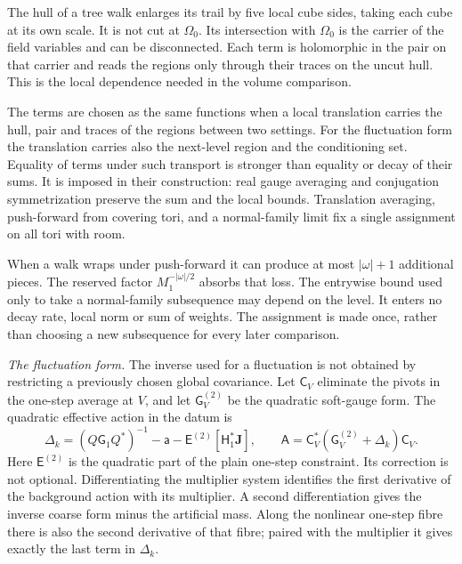 \documentclass[11pt,letterpaper,reqno]{amsart}
\theoremstyle{definition}
\theoremstyle{remark}
\begin{document}
The hull of a tree walk enlarges its trail by
five local cube sides, taking each cube at its
own scale. It is not cut at $\Omega_0$. Its
intersection with $\Omega_0$ is the carrier of
the field variables and can be disconnected.
Each term is holomorphic in the pair on that
carrier and reads the regions only through
their traces on the uncut hull. This is the
local dependence needed in the volume comparison.

The terms are chosen as the same functions when
a local translation carries the hull, pair and
traces of the regions between two settings.
For the fluctuation form the translation carries
also the next-level region and the conditioning
set. Equality of terms under such transport is
stronger than equality or decay of their sums.
It is imposed in their construction: real gauge
averaging and conjugation symmetrization preserve
the sum and the local bounds. Translation
averaging, push-forward from covering tori, and
a normal-family limit fix a single assignment
on all tori with room.

When a walk wraps under push-forward it can
produce at most $|\omega|+1$ additional pieces.
The reserved factor $M_1^{-|\omega|/2}$ absorbs
that loss. The entrywise bound used only to
take a normal-family subsequence may depend
on the level. It enters no decay rate, local
norm or sum of weights. The assignment is
made once, rather than choosing a new
subsequence for every later comparison.

\emph{The fluctuation form.}
The inverse used for a fluctuation is not
obtained by restricting a previously chosen
global covariance. Let $\mathsf C_V$ eliminate
the pivots in the one-step average at $V$,
and let $\mathsf G_V^{(2)}$ be the quadratic
soft-gauge form. The quadratic effective
action in the datum is
\[
 \Delta_k=(Q\mathsf G_1Q^*)^{-1}-\mathsf a
              -\mathsf E^{(2)}[\mathsf H_1^*\mathbf J],
 \qquad
 \mathsf A=\mathsf C_V^*(\mathsf G_V^{(2)}+\Delta_k)\mathsf C_V.
\]
Here $\mathsf E^{(2)}$ is the quadratic part of
the plain one-step constraint. Its correction
is not optional. Differentiating the multiplier
system identifies the first derivative of the
background action with its multiplier. A
second differentiation gives the inverse
coarse form minus the artificial mass.
Along the nonlinear one-step fibre there is
also the second derivative of that fibre;
paired with the multiplier it gives exactly
the last term in $\Delta_k$.
\end{document}
